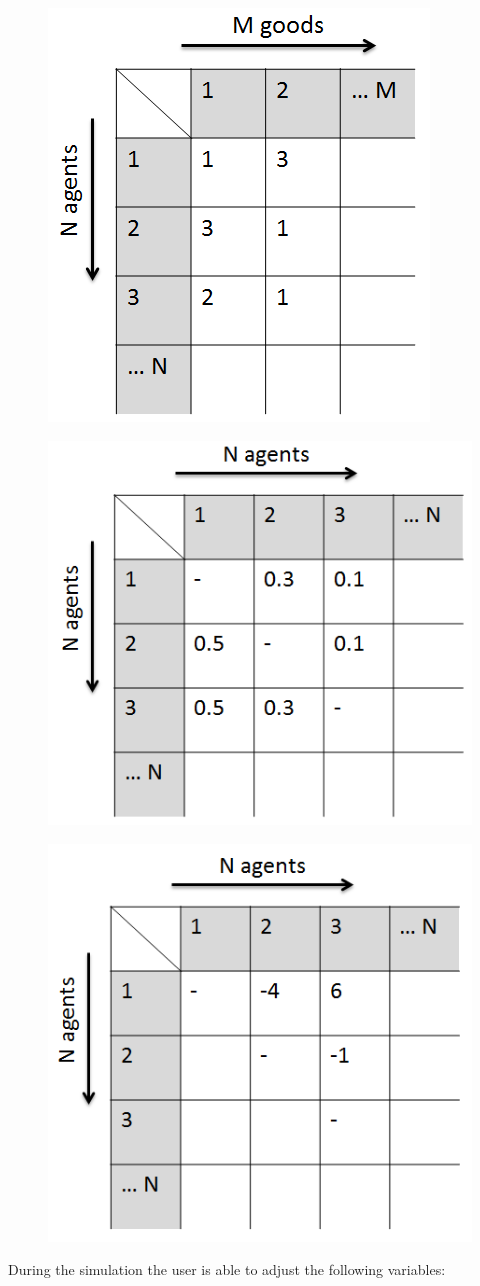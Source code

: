 \documentclass[twoside,openright]{uva-bachelor-thesis}
\begin{document}
\begin{figure}[h]
\centering
\begin{minipage}{.5\textwidth}
  \centering
  \includegraphics[width=.4\linewidth]{Matrices/Nominal_values}
\end{minipage}%
\begin{minipage}{.6\textwidth}
  \centering
  \includegraphics[width=.4\linewidth]{Matrices/Like_factors}
  \label{fig:test2}
\end{minipage}
\begin{minipage}{.6\textwidth}
  \centering
  \includegraphics[width=.4\linewidth]{Matrices/Account_balance}
  \label{fig:test3}
\end{minipage}
\end{figure}


During the simulation the user is able to adjust the following variables:
\end{document}
